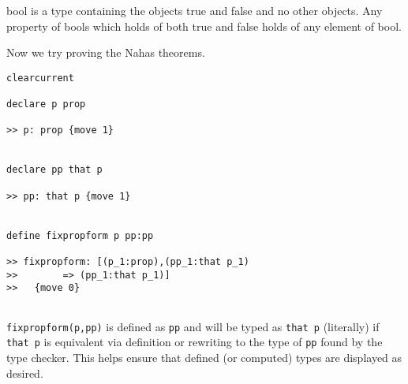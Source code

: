 \documentclass[12pt]{article}
\begin{document}
bool is a type containing the objects true and false and no other objects.  Any property of bools which holds of both true and false holds of any element of bool.

Now we try proving the Nahas theorems.

\begin{verbatim}
clearcurrent

declare p prop

>> p: prop {move 1}


declare pp that p

>> pp: that p {move 1}


define fixpropform p pp:pp

>> fixpropform: [(p_1:prop),(pp_1:that p_1) 
>>        => (pp_1:that p_1)]
>>   {move 0}


\end{verbatim}

{\tt fixpropform(p,pp)} is defined as {\tt pp} and will be typed as {\tt that p} (literally) if {\tt that p} is equivalent via definition or rewriting to the type of {\tt pp} found by the type checker.  This helps
ensure that defined (or computed) types are displayed as desired.
\end{document}
